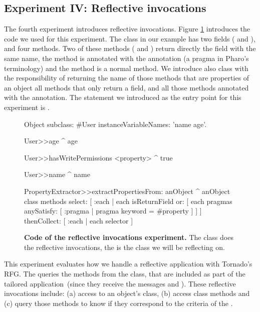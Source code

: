 \subsection*{Experiment IV: Reflective invocations} \label{sec:results_helloworld}

The fourth experiment introduces reflective invocations. Figure \ref{fig:reflective_invocations} introduces the code we used for this experiment. The  class in our example has two fields ( and ), and four methods. Two of these methods ( and ) return directly the field with the same name, the method  is annotated with the  annotation (a pragma in Pharo's terminology) and the method  is a normal method. We introduce also  class with the responsibility of returning the name of those methods that are properties of an object \ie all methods that only return a field, and all those methods annotated with the  annotation. The statement we introduced as the entry point for this experiment is .

\begin{figure}[ht]
\begin{code}
Object subclass: #User
	instanceVariableNames: 'name age'.

User>>age
	^ age

User>>hasWritePermissions
	<property>
	^ true

User>>name
	^ name

PropertyExtractor>>extractPropertiesFrom: anObject
	^ anObject class methods
		select: [ :each | each isReturnField
			or: [ each pragmas anySatisfy: [ :pragma | pragma keyword = #property ] ] ]
		thenCollect: [ :each | each selector ]

\end{code}
\caption{ \textbf{Code of the reflective invocations experiment.} The  class does the reflective invocations, the  is the class we will be reflecting on.\label{fig:reflective_invocations}}
\end{figure}

This experiment evaluates how we handle a reflective application with Tornado's RFG. The  queries the methods from the  class, that are included as part of the tailored application~(since they receive the messages  and ). These reflective invocations include: (a) access to an object's class, (b) access class methods and (c) query those methods to know if they correspond to the criteria of the .

